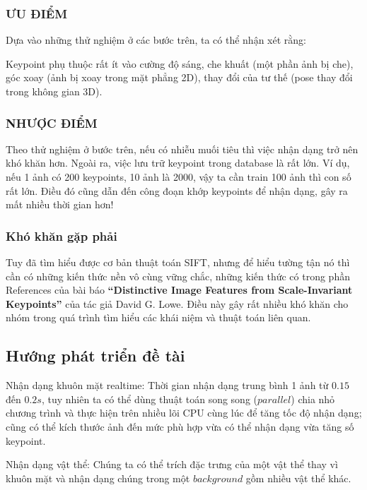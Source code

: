 \documentclass[conference]{IEEEtran}
\begin{document}
\subsubsection{ƯU ĐIỂM}
Dựa vào những thử nghiệm ở các bước trên, ta có thể nhận xét rằng:

Keypoint phụ thuộc rất ít vào cường độ sáng, che khuất (một phần ảnh bị che), góc xoay (ảnh bị xoay trong mặt phẳng 2D), thay đổi của tư thế (pose thay đổi trong không gian 3D).
\\

\subsubsection{NHƯỢC ĐIỂM}
Theo thử nghiệm ở bước trên, nếu có nhiễu muối tiêu thì việc nhận dạng trở nên khó khăn hơn. Ngoài ra, việc lưu trữ keypoint trong database là rất lớn. Ví dụ, nếu 1 ảnh có 200 keypoints, 10 ảnh là 2000, vậy ta cần train 100 ảnh thì con số rất lớn. Điều đó cũng dẫn đến công đoạn khớp keypoints để nhận dạng, gây ra mất nhiều thời gian hơn!\\


    \subsubsection{Khó khăn gặp phải}Tuy đã tìm hiểu được cơ bản thuật toán SIFT, nhưng để hiểu tường tận nó thì cần có những kiến thức nền vô cùng vững chắc, những kiến thức có trong phần References của bài báo \textbf{“Distinctive Image Features from Scale-Invariant Keypoints”} của tác giả David G. Lowe. Điều này gây rất nhiều khó khăn cho nhóm trong quá trình tìm hiểu các khái niệm và thuật toán liên quan.
\subsection{Hướng phát triển đề tài}
Nhận dạng khuôn mặt realtime: Thời gian nhận dạng trung bình 1 ảnh từ $0.15$ đến $0.2s$, tuy nhiên ta có thể dùng thuật toán song song ($parallel$) chia nhỏ chương trình và thực hiện trên nhiều lõi CPU cùng lúc để tăng tốc độ nhận dạng; cũng có thể kích thước ảnh đến mức phù hợp vừa có thể nhận dạng vừa tăng số keypoint.

    Nhận dạng vật thể: Chúng ta có thể trích đặc trưng của một vật thể thay vì khuôn mặt và nhận dạng chúng trong một $background$ gồm nhiều vật thể khác.
\end{document}
